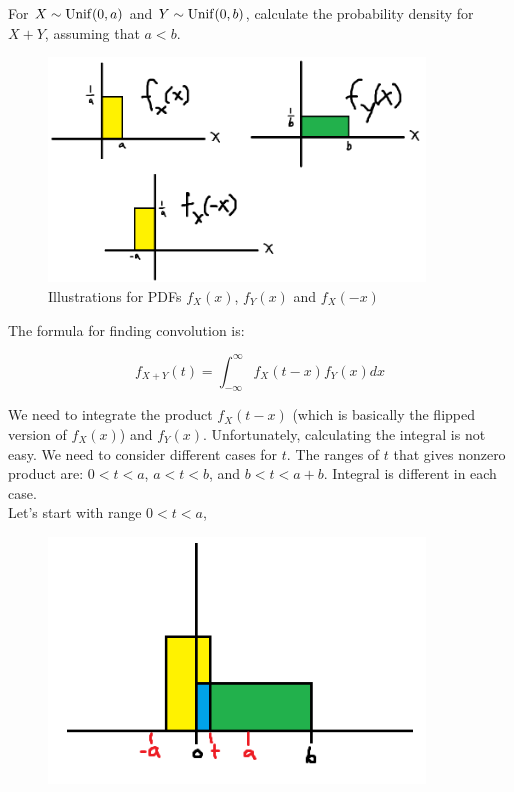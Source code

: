 \begin{texample}
	For $X\sim \operatorname{Unif}(0,a)$ and $Y\sim \operatorname{Unif}(0,b)$, calculate the probability density for $X+Y$, assuming that $a<b$. \\
	
	\begin{figure}[H]
		\centering
		\includegraphics[width=100mm]{24.png}
		\caption{Illustrations for PDFs $f_X(x)$, $f_Y(x)$ and $f_X(-x)$}
	\end{figure}
	
	The formula for finding convolution is:
	
	\[ f_{X+Y}(t)=\int_{-\infty}^\infty f_X(t-x) f_Y(x) dx \]
	
	We need to integrate the product $f_X(t-x)$ (which is basically the flipped version of $f_X(x)$) and $f_Y(x)$. Unfortunately, calculating the integral is not easy. We need to consider different cases for $t$. The ranges of $t$ that gives nonzero product are: $0<t<a$, $a<t<b$, and $b<t<a+b$. Integral is different in each case. \\
	
	Let's start with range $0<t<a$,
	
	\begin{figure}[H]
		\centering
		\includegraphics[width=100mm]{25.png}
	\end{figure}
	

\end{texample}
